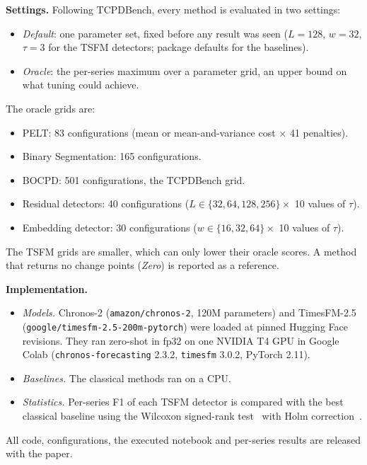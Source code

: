 \documentclass[conference]{IEEEtran}
\begin{document}
\textbf{Settings.} Following TCPDBench, every method is evaluated in two settings:
\begin{itemize}
\item \emph{Default}: one parameter set, fixed before any result was seen ($L=128$, $w=32$, $\tau=3$ for the TSFM detectors; package defaults for the baselines).
\item \emph{Oracle}: the per-series maximum over a parameter grid, an upper bound on what tuning could achieve.
\end{itemize}
The oracle grids are:
\begin{itemize}
\item PELT: 83 configurations (mean or mean-and-variance cost $\times$ 41 penalties).
\item Binary Segmentation: 165 configurations.
\item BOCPD: 501 configurations, the TCPDBench grid.
\item Residual detectors: 40 configurations ($L\in\{32,64,128,256\}\times$ 10 values of $\tau$).
\item Embedding detector: 30 configurations ($w\in\{16,32,64\}\times$ 10 values of $\tau$).
\end{itemize}
The TSFM grids are smaller, which can only lower their oracle scores. A method that returns no change points (\emph{Zero}) is reported as a reference.

\textbf{Implementation.}
\begin{itemize}
\item \emph{Models.} Chronos-2 (\texttt{amazon/chronos-2}, 120M parameters) and TimesFM-2.5 (\texttt{google/timesfm-2.5-200m-pytorch}) were loaded at pinned Hugging Face revisions. They ran zero-shot in fp32 on one NVIDIA T4 GPU in Google Colab (\texttt{chronos-forecasting} 2.3.2, \texttt{timesfm} 3.0.2, PyTorch 2.11).
\item \emph{Baselines.} The classical methods ran on a CPU.
\item \emph{Statistics.} Per-series F1 of each TSFM detector is compared with the best classical baseline using the Wilcoxon signed-rank test~\cite{wilcoxon1945} with Holm correction~\cite{holm1979}.
\end{itemize}
All code, configurations, the executed notebook and per-series results are released with the paper.







\end{document}
